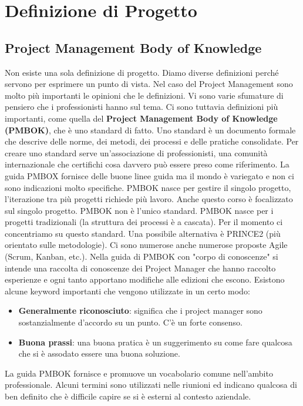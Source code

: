 \section{Definizione di Progetto}
\subsection{Project Management Body of Knowledge}
Non esiste una sola definizione di progetto. Diamo diverse definizioni perché servono per esprimere un punto di vista. Nel caso del Project Management sono molto più importanti le opinioni che le definizioni. Vi sono varie sfumature di pensiero che i professionisti hanno sul tema. Ci sono tuttavia definizioni più importanti, come quella del \textbf{Project Management Body of Knowledge (PMBOK)}, che è uno standard di fatto. Uno standard è un documento formale che descrive delle norme, dei metodi, dei processi e delle pratiche consolidate. Per creare uno standard serve un'associazione di professionisti, una comunità internazionale che certifichi cosa davvero può essere preso come riferimento.\newline
La guida PMBOX fornisce delle buone linee guida ma il mondo è variegato e non ci sono indicazioni molto specifiche.\newline
PMBOK nasce per gestire il singolo progetto, l'iterazione tra più progetti richiede più lavoro. Anche questo corso è focalizzato sul singolo progetto.\newline
PMBOK non è l'unico standard. PMBOK nasce per i progetti tradizionali (la struttura dei processi è a cascata). Per il momento ci concentriamo su questo standard. Una possibile alternativa è PRINCE2 (più orientato sulle metodologie). Ci sono numerose anche numerose proposte Agile (Scrum, Kanban, etc.).\newline\newline
Nella guida di PMBOK con "corpo di conoscenze" si intende una raccolta di conoscenze dei Project Manager che hanno raccolto esperienze e ogni tanto apportano modifiche alle edizioni che escono.\newline
Esistono alcune keyword importanti che vengono utilizzate in un certo modo:
\begin{itemize}
	\item \textbf{Generalmente riconosciuto}: significa che i project manager sono sostanzialmente d'accordo su un punto. C'è un forte consenso.
	\item \textbf{Buona prassi}: una buona pratica è un suggerimento su come fare qualcosa che si è assodato essere una buona soluzione. 
\end{itemize}
La guida PMBOK fornisce e promuove un vocabolario comune nell'ambito professionale. Alcuni termini sono utilizzati nelle riunioni ed indicano qualcosa di ben definito che è difficile capire se si è esterni al contesto aziendale.\newline
